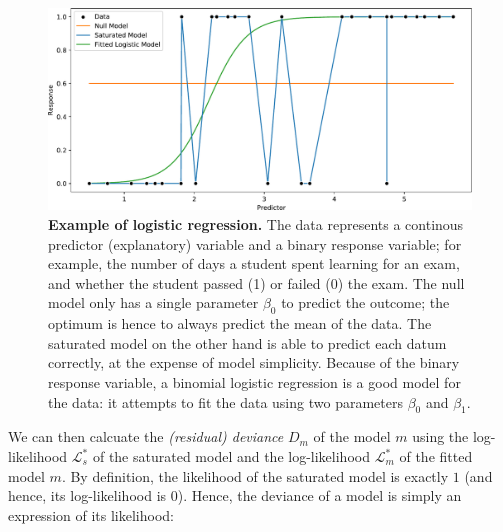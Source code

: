 \begin{figure}[!htb]
    \centering
    \includegraphics[width=\linewidth]{pdf/logistic_regression.pdf}
    \caption[Example of logistic regression]{
        \textbf{Example of logistic regression.}
        The data represents a continous predictor (explanatory) variable and a binary response variable;
        for example, the number of days a student spent learning for an exam,
        and whether the student passed (1) or failed (0) the exam.
        The null model only has a single parameter $\beta_0$ to predict the outcome;
        the optimum is hence to always predict the mean of the data.
        The saturated model on the other hand is able to predict each datum correctly,
        at the expense of model simplicity.
        Because of the binary response variable, a binomial logistic regression is a good model for the data:
        it attempts to fit the data using two parameters $\beta_0$ and $\beta_1$.
    }
    \label{fig:logistic_regression}
\end{figure}



We can then calcuate the \emph{(residual) deviance} $D_m$ of the model $m$ using
the log-likelihood $\mathcal{L}^*_s$ of the saturated model
and the log-likelihood $\mathcal{L}^*_m$ of the fitted model $m$.
By definition, the likelihood of the saturated model is exactly $1$
(and hence, its log-likelihood is $0$).
Hence, the deviance of a model is simply an expression of its likelihood:

